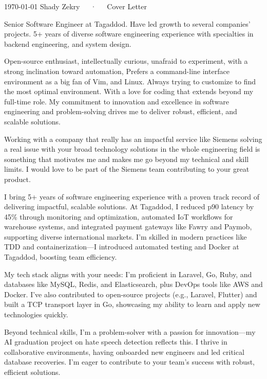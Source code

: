 \documentclass[11pt, a4paper]{awesome-cv}
\begin{document}
\makecvheader[R]

\makecvfooter
  {\today}
  {Shady Zekry~~~·~~~Cover Letter}
  {}

\makelettertitle

\begin{cvletter}

Senior Software Engineer at Tagaddod. Have led growth to several companies' projects. 5+ years of diverse software engineering experience with specialties in backend engineering, and system design.

Open-source enthusiast, intellectually curious, unafraid to experiment, with a strong inclination toward automation, Prefers a command-line interface environment as a big fan of Vim, and Linux. Always trying to customize to find the most optimal environment. With a love for coding that extends beyond my full-time role. My commitment to innovation and excellence in software engineering and problem-solving drives me to deliver robust, efficient, and scalable solutions.

Working with a company that really has an impactful service like Siemens solving a real issue with your broad technology solutions in the whole engineering field is something that motivates me and makes me go beyond my technical and skill limits. I would love to be part of the Siemens team contributing to your great product.

I bring 5+ years of software engineering experience with a proven track record of delivering impactful, scalable solutions. At Tagaddod, I reduced p90 latency by 45\% through monitoring and optimization, automated IoT workflows for warehouse systems, and integrated payment gateways like Fawry and Paymob, supporting diverse international markets. I’m skilled in modern practices like TDD and containerization—I introduced automated testing and Docker at Tagaddod, boosting team efficiency.

My tech stack aligns with your needs: I’m proficient in Laravel, Go, Ruby, and databases like MySQL, Redis, and Elasticsearch, plus DevOps tools like AWS and Docker. I’ve also contributed to open-source projects (e.g., Laravel, Flutter) and built a TCP transport layer in Go, showcasing my ability to learn and apply new technologies quickly.

Beyond technical skills, I’m a problem-solver with a passion for innovation—my AI graduation project on hate speech detection reflects this. I thrive in collaborative environments, having onboarded new engineers and led critical database recoveries. I’m eager to contribute to your team’s success with robust, efficient solutions.

\end{cvletter}


\makeletterclosing
\end{document}
